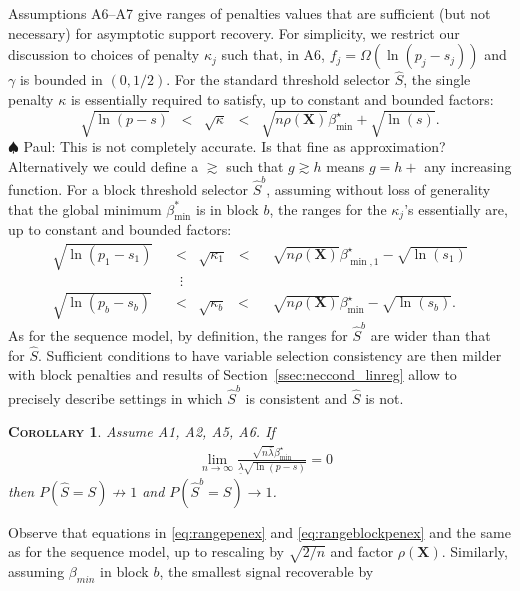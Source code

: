 \documentclass[aos]{imsart}
\theoremstyle{plain}
\newtheorem{cor}[thm]{\textsc{Corollary}}
\newcommand{\paul}[1]{{\small{\color{green} \sf $\spadesuit$ Paul: #1}}}
\newcommand{\bs}{\boldsymbol}
\begin{document}
\noindent Assumptions A6--A7 give ranges of penalties values that are sufficient (but not necessary) for asymptotic support recovery. For simplicity, we restrict our discussion to choices of penalty $\kappa_j$ such that, in A6, $f_j=\Omega(\ln(p_j-s_j))$ and $\gamma$ is bounded in $(0,1/2)$. For the standard threshold selector $\hat{S}$, the single penalty $\kappa$ is essentially required to satisfy, up to constant and bounded factors:
\begin{equation}\label{eq:rangepenex}
  \sqrt{\ln(p-s)}\;\;<\;\;\sqrt{\kappa}\;\;<\;\;\sqrt{n\rho(\bs X)}\beta^{\star}_{\min}+\sqrt{\ln(s)}.	
\end{equation}
\paul{This is not completely accurate. Is that fine as approximation? Alternatively we could define a $\gtrsim$ such that $g\gtrsim h$ means $g=h+$ any increasing function.}
For a block threshold selector $\hat{S}^{b}$, assuming without loss of generality that the global minimum $\beta_{\min}^*$ is in block $b$, the ranges for the $\kappa_j$'s essentially are, up to constant and bounded factors:
    \begin{eqnarray}\label{eq:rangeblockpenex}
  \sqrt{\ln(p_1-s_1)}\;\;&<\;\;\sqrt{\kappa_1}\;\;<&\;\;\sqrt{n\rho(\bs X)}\beta^{\star}_{\min,1}-\sqrt{\ln(s_1)}\nonumber\\
  &\;\;\vdots \\
  \sqrt{\ln(p_b-s_b)}\;\;&<\;\;\sqrt{\kappa_b}\;\;<&\;\;\sqrt{n\rho(\bs X)}\beta^{\star}_{\min}-\sqrt{\ln(s_b)} \nonumber.       
    \end{eqnarray}
As for the sequence model, by definition, the ranges for $\hat S^b$ are wider than that for $\hat S$. Sufficient conditions to have variable selection consistency are then milder with block penalties and results of Section~\ref{ssec:neccond_linreg} allow to precisely describe settings in which $\hat S^b$ is consistent and $\hat S$ is not.
\begin{cor}\label{cor:selconstimpossiblereg}
Assume A1, A2, A5, A6. If
\begin{eqnarray*}
&\lim_{n\to\infty}\frac{\sqrt{n\bar{\lambda}}\beta_{\min}^{\star}}{\underline{\lambda}\sqrt{\ln(p-s)}} = 0
\end{eqnarray*}
then 
$P(\hat{S} = S)\not \to 1$ and $P(\hat{S}^{b} = S)\to 1$.
\end{cor}

Observe that equations in \eqref{eq:rangepenex} and \eqref{eq:rangeblockpenex} and the same as for the sequence model, up to rescaling by $\sqrt{2/n}$ and factor $\rho(\bs X)$. Similarly, assuming $\beta_{min}$ in block $b$, the smallest signal recoverable by $$
\end{document}
